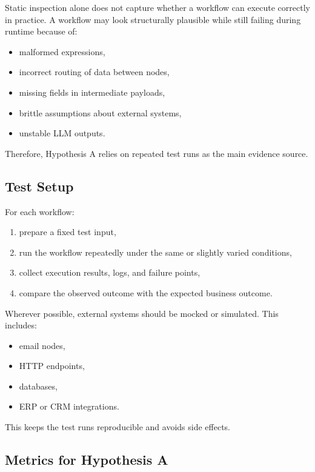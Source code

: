 \documentclass[12pt,a4paper]{article}
\begin{document}
Static inspection alone does not capture whether a workflow can execute correctly in practice. A workflow may look structurally plausible while still failing during runtime because of:

\begin{itemize}
  \item malformed expressions,
  \item incorrect routing of data between nodes,
  \item missing fields in intermediate payloads,
  \item brittle assumptions about external systems,
  \item unstable LLM outputs.
\end{itemize}

Therefore, Hypothesis A relies on repeated test runs as the main evidence source.

\subsection{Test Setup}

For each workflow:

\begin{enumerate}
  \item prepare a fixed test input,
  \item run the workflow repeatedly under the same or slightly varied conditions,
  \item collect execution results, logs, and failure points,
  \item compare the observed outcome with the expected business outcome.
\end{enumerate}

Wherever possible, external systems should be mocked or simulated. This includes:

\begin{itemize}
  \item email nodes,
  \item HTTP endpoints,
  \item databases,
  \item ERP or CRM integrations.
\end{itemize}

This keeps the test runs reproducible and avoids side effects.

\subsection{Metrics for Hypothesis A}
\end{document}
